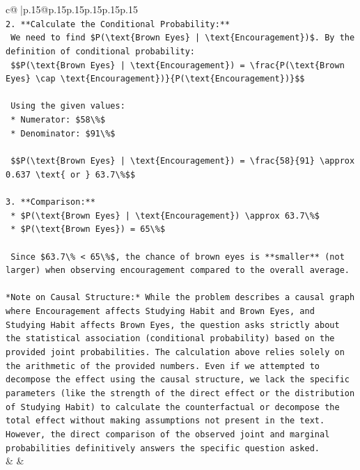 \documentclass{article}
\begin{document}
{\begin{supertabular}{c@{$\;$}|p{.15\linewidth}@{}p{.15\linewidth}p{.15\linewidth}p{.15\linewidth}p{.15\linewidth}p{.15\linewidth}}
{{{\\ 
\texttt{2.  **Calculate the Conditional Probability:**} \\
\texttt{    We need to find \$P(\textbackslash{}text\{Brown Eyes\} | \textbackslash{}text\{Encouragement\})\$. By the definition of conditional probability:} \\
\texttt{    \$\$P(\textbackslash{}text\{Brown Eyes\} | \textbackslash{}text\{Encouragement\}) = \textbackslash{}frac\{P(\textbackslash{}text\{Brown Eyes\} \textbackslash{}cap \textbackslash{}text\{Encouragement\})\}\{P(\textbackslash{}text\{Encouragement\})\}\$\$} \\
\\ 
\texttt{    Using the given values:} \\
\texttt{    *   Numerator: \$58\textbackslash{}\%\$} \\
\texttt{    *   Denominator: \$91\textbackslash{}\%\$} \\
\\ 
\texttt{    \$\$P(\textbackslash{}text\{Brown Eyes\} | \textbackslash{}text\{Encouragement\}) = \textbackslash{}frac\{58\}\{91\} \textbackslash{}approx 0.637 \textbackslash{}text\{ or \} 63.7\textbackslash{}\%\$\$} \\
\\ 
\texttt{3.  **Comparison:**} \\
\texttt{    *   \$P(\textbackslash{}text\{Brown Eyes\} | \textbackslash{}text\{Encouragement\}) \textbackslash{}approx 63.7\textbackslash{}\%\$} \\
\texttt{    *   \$P(\textbackslash{}text\{Brown Eyes\}) = 65\textbackslash{}\%\$} \\
\\ 
\texttt{    Since \$63.7\textbackslash{}\% < 65\textbackslash{}\%\$, the chance of brown eyes is **smaller** (not larger) when observing encouragement compared to the overall average.} \\
\\ 
\texttt{*Note on Causal Structure:* While the problem describes a causal graph where Encouragement affects Studying Habit and Brown Eyes, and Studying Habit affects Brown Eyes, the question asks strictly about the statistical association (conditional probability) based on the provided joint probabilities. The calculation above relies solely on the arithmetic of the provided numbers. Even if we attempted to decompose the effect using the causal structure, we lack the specific parameters (like the strength of the direct effect or the distribution of Studying Habit) to calculate the counterfactual or decompose the total effect without making assumptions not present in the text. However, the direct comparison of the observed joint and marginal probabilities definitively answers the specific question asked.} \\
            }
        }
    }
    & & \\ \\


\end{supertabular}}
\end{document}
